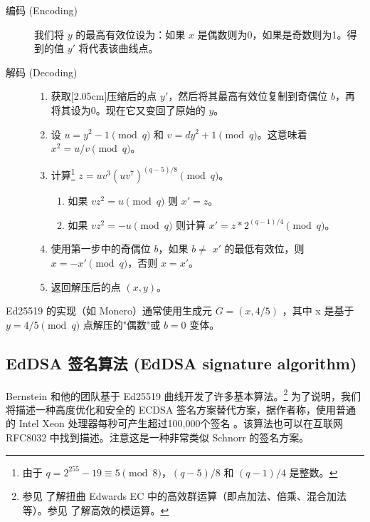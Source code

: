 \begin{description}
	\item[编码 (Encoding)] 我们将 $y$ 的最高有效位设为：如果 $x$ 是偶数则为0，如果是奇数则为1。得到的值 $y'$ 将代表该曲线点。
	
	\item[解码 (Decoding)] \hfill
	    \begin{enumerate}
    	    \item 获取[2.05cm]压缩后的点 $y'$，然后将其最高有效位复制到奇偶位 $b$，再将其设为0。现在它又变回了原始的 $y$。
    	    \item 设 \(u = y^2-1 \pmod q\) 和 \(v = d y^2  + 1 \pmod q\)。这意味着 $x^2 = u/v \pmod q$。
    	    \item 计算\footnote{由于 $q = 2^{255}-19 \equiv 5 \pmod{8}$，$(q-5)/8$ 和 $(q-1)/4$ 是整数。} \(z = u v^3 (u v^7)^{(q-5)/8} \pmod q\)。
            \begin{enumerate}
                \item 如果 \(v z^2 = u \pmod q\) 则 \(x' = z\)。
                \item 如果 \(v z^2 = -u \pmod q\) 则计算 \(x' = z*2^{(q-1)/4} \pmod q\)。
            \end{enumerate}
            \item 使用第一步中的奇偶位 \(b\)，如果 $b \ne$ $x'$ 的最低有效位，则 \(x = -x' \pmod q\)，否则 \(x = x'\)。
            \item 返回解压后的点 $(x,y)$。
	    \end{enumerate}
\end{description}

Ed25519 的实现（如 Monero）通常使用生成元 $G = (x,4/5)$ \cite{Bernstein2012}，其中 x 是基于 \(y = 4/5 \pmod q\) 点解压的"偶数"或 $b = 0$ 变体。


\subsection{EdDSA 签名算法 (EdDSA signature algorithm)}
\label{EdDSA_section}

Bernstein 和他的团队基于 Ed25519 曲线开发了许多基本算法。\footnote{\label{group_ops_twisted_edwards_note}参见 \cite{Bernstein2007} 了解扭曲 Edwards EC 中的高效群运算（即点加法、倍乘、混合加法等）。参见 \cite{curve25519} 了解高效的模运算。}
为了说明，我们将描述一种高度优化和安全的 ECDSA 签名方案替代方案，据作者称，使用普通的 Intel Xeon 处理器每秒可产生超过100,000个签名 \cite{Bernstein2012}。该算法也可以在互联网 RFC8032 \cite{rfc8032} 中找到描述。注意这是一种非常类似 Schnorr 的签名方案。


